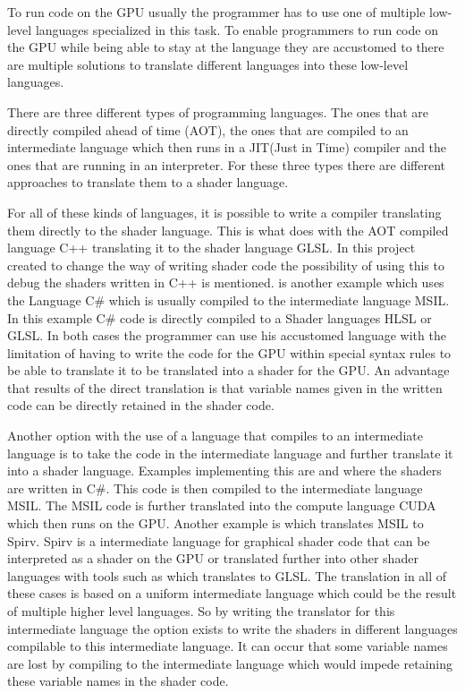 To run code on the GPU usually the programmer has to use one of  multiple low-level languages specialized in this task. To enable programmers to run code on the GPU while being able to stay at the language they are accustomed to there are multiple solutions to translate different languages into these low-level languages.

There are three different types of programming languages. The ones that are directly compiled ahead of time (AOT), the ones that are compiled to an intermediate language which then runs in a JIT(Just in Time) compiler and the ones that are running in an interpreter. For these three types there are different approaches to translate them to a shader language.

For all of these kinds of languages, it is possible to write a compiler translating them directly to the shader language. This is what  does with the AOT compiled language C++ translating it to the shader language GLSL. In this project created to change the way of writing shader code the possibility of using this to debug the shaders written in C++ is mentioned.  is another example which uses the Language C\# which is usually compiled to the intermediate language MSIL. In this example C\# code is directly compiled to a Shader languages HLSL or GLSL. In both cases the programmer can use his accustomed language with the limitation of having to write the code for the GPU within special syntax rules to be able to translate it to be translated into a shader for the GPU. An advantage that results of the direct translation is that variable names given in the written code can be directly retained in the shader code.

Another option with the use of a language that compiles to an intermediate language is to take the code in the intermediate language and further translate it into a shader language. Examples implementing this are  and  where the shaders are written in C\#. This code is then compiled to the intermediate language MSIL. The MSIL code is further translated into the compute language CUDA which then runs on the GPU. Another example is  which translates MSIL to Spirv. Spirv is a intermediate language for graphical shader code that can be interpreted as a shader on the GPU or translated further into other shader languages with tools such as  which translates to GLSL. The translation in all of these cases is based on a uniform intermediate language which could be the result of multiple higher level languages. So by writing the translator for this intermediate language the option exists to write the shaders in different languages compilable to this intermediate language. It can occur that some variable names are lost by compiling to the intermediate language which would impede retaining these variable names in the shader code. 

